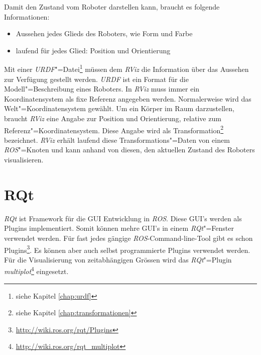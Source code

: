 Damit  den Zustand vom Roboter darstellen kann, braucht es folgende Informationen:
\begin{itemize}
\item Aussehen jedes Glieds des Roboters, wie Form und Farbe 
\item laufend für jedes Glied: Position und Orientierung
\end{itemize}

Mit einer \textit{URDF}"=Datei\footnote{siehe Kapitel \ref{chap:urdf}} müssen dem \textit{RViz} die Information über das Aussehen zur Verfügung gestellt werden.
\textit{URDF} ist ein Format für die Modell"=Beschreibung eines Roboters.
In \textit{RViz} muss immer ein Koordinatensystem als fixe Referenz angegeben werden.
Normalerweise wird das Welt"=Koordinatensystem gewählt.
Um ein Körper im Raum darzustellen, braucht \textit{RViz} eine Angabe zur Position und Orientierung, relative zum Referenz"=Koordinatensystem.
Diese Angabe wird als Transformation\footnote{siehe Kapitel \ref{chap:transformationen}} bezeichnet.
\textit{RViz} erhält laufend diese Transformations"=Daten von einem \textit{ROS}"=Knoten und kann anhand von diesen, den aktuellen Zustand des Roboters visualisieren.




\section{RQt}
\label{chap:rqt}
\textit{RQt} ist Framework für die GUI Entwicklung in \textit{ROS}.
Diese GUI's werden als Plugins implementiert.
Somit können mehre GUI's in einem \textit{RQt}"=Fenster verwendet werden.
Für fast jedes gängige \textit{ROS}-Command-line-Tool gibt es schon Plugins\footnote{\url{http://wiki.ros.org/rqt/Plugins}}.
Es können aber auch selbst programmierte Plugins verwendet werden. 
Für die Visualisierung von zeitabhängigen Grössen wird das \textit{RQt}"=Plugin \textit{multiplot}\footnote{\url{http://wiki.ros.org/rqt_multiplot}} eingesetzt. %

